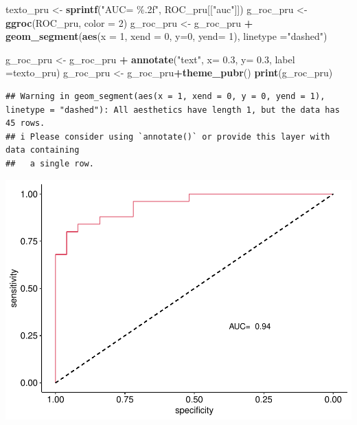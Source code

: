 \documentclass[
]{article}
\newenvironment{Shaded}{\begin{snugshade}}{\end{snugshade}}
\newcommand{\AttributeTok}[1]{\textcolor[rgb]{0.13,0.29,0.53}{#1}}
\newcommand{\DecValTok}[1]{\textcolor[rgb]{0.00,0.00,0.81}{#1}}
\newcommand{\FloatTok}[1]{\textcolor[rgb]{0.00,0.00,0.81}{#1}}
\newcommand{\FunctionTok}[1]{\textcolor[rgb]{0.13,0.29,0.53}{\textbf{#1}}}
\newcommand{\NormalTok}[1]{#1}
\newcommand{\OtherTok}[1]{\textcolor[rgb]{0.56,0.35,0.01}{#1}}
\newcommand{\SpecialCharTok}[1]{\textcolor[rgb]{0.81,0.36,0.00}{\textbf{#1}}}
\newcommand{\StringTok}[1]{\textcolor[rgb]{0.31,0.60,0.02}{#1}}
\begin{document}
\begin{Shaded}
\begin{Highlighting}[]
\NormalTok{texto\_pru }\OtherTok{\textless{}{-}} \FunctionTok{sprintf}\NormalTok{(}\StringTok{"AUC=  \%.2f"}\NormalTok{, ROC\_pru[[}\StringTok{"auc"}\NormalTok{]]) }
\NormalTok{g\_roc\_pru }\OtherTok{\textless{}{-}} \FunctionTok{ggroc}\NormalTok{(ROC\_pru, }\AttributeTok{color =} \DecValTok{2}\NormalTok{)}
\NormalTok{g\_roc\_pru }\OtherTok{\textless{}{-}}\NormalTok{ g\_roc\_pru }\SpecialCharTok{+} \FunctionTok{geom\_segment}\NormalTok{(}\FunctionTok{aes}\NormalTok{(}\AttributeTok{x =} \DecValTok{1}\NormalTok{, }\AttributeTok{xend =} \DecValTok{0}\NormalTok{, }
                                          \AttributeTok{y=}\DecValTok{0}\NormalTok{, }\AttributeTok{yend=} \DecValTok{1}\NormalTok{),}
                                      \AttributeTok{linetype =}\StringTok{"dashed"}\NormalTok{)}

\NormalTok{g\_roc\_pru }\OtherTok{\textless{}{-}}\NormalTok{ g\_roc\_pru }\SpecialCharTok{+} \FunctionTok{annotate}\NormalTok{(}\StringTok{"text"}\NormalTok{, }\AttributeTok{x=} \FloatTok{0.3}\NormalTok{, }\AttributeTok{y=} \FloatTok{0.3}\NormalTok{, }\AttributeTok{label =}\NormalTok{texto\_pru) }
\NormalTok{g\_roc\_pru }\OtherTok{\textless{}{-}}\NormalTok{ g\_roc\_pru}\SpecialCharTok{+}\FunctionTok{theme\_pubr}\NormalTok{()}
\FunctionTok{print}\NormalTok{(g\_roc\_pru)}
\end{Highlighting}
\end{Shaded}

\begin{verbatim}
## Warning in geom_segment(aes(x = 1, xend = 0, y = 0, yend = 1), linetype = "dashed"): All aesthetics have length 1, but the data has 45 rows.
## i Please consider using `annotate()` or provide this layer with data containing
##   a single row.
\end{verbatim}

\includegraphics{ep10_files/figure-latex/unnamed-chunk-5-2.pdf}
\end{document}
